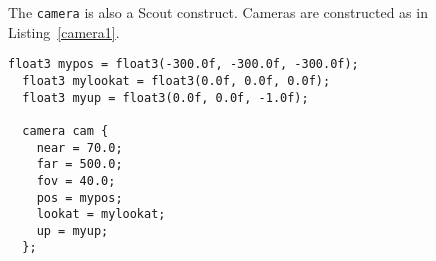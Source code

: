 The \texttt{camera} is also a Scout construct.  Cameras are constructed as in
Listing~\ref{camera1}.

\par\bigskip
\begin{lstlisting}[float=h,label=camera1,
	caption={How to construct a \texttt{camera}.}]
  float3 mypos = float3(-300.0f, -300.0f, -300.0f);
  float3 mylookat = float3(0.0f, 0.0f, 0.0f);
  float3 myup = float3(0.0f, 0.0f, -1.0f);

  camera cam {
    near = 70.0;
    far = 500.0;
    fov = 40.0;
    pos = mypos;
    lookat = mylookat;
    up = myup;
  };
\end{lstlisting}
\par\bigskip\noindent


%
%
%
%
%
%

